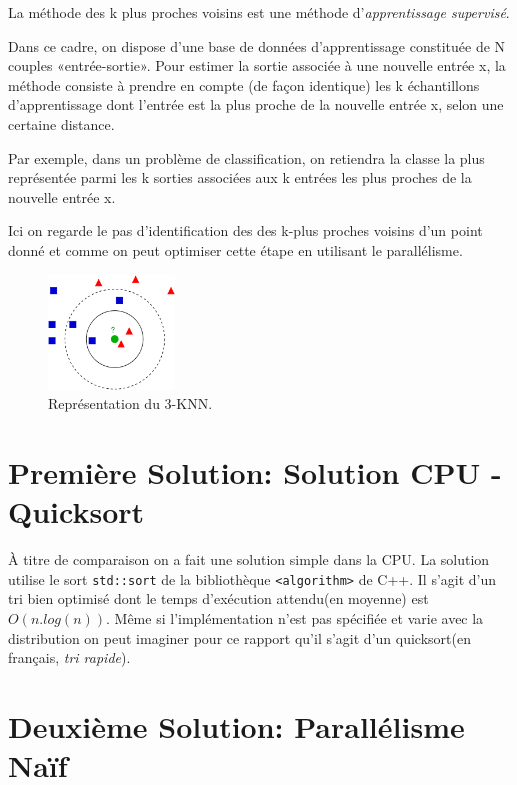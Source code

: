 \documentclass[12pt,oneside]{article}
\begin{document}
La méthode des k plus proches voisins est une méthode d’\textit{apprentissage supervisé}.

Dans ce cadre, on dispose d’une base de données d'apprentissage constituée de N couples «entrée-sortie». Pour estimer la sortie associée à une nouvelle entrée x, la méthode consiste à prendre en compte (de façon identique) les k échantillons d'apprentissage dont l’entrée est la plus proche de la nouvelle entrée x, selon une certaine distance.

Par exemple, dans un problème de classification, on retiendra la classe la plus représentée parmi les k sorties associées aux k entrées les plus proches de la nouvelle entrée x.

Ici on regarde le pas d'identification des des k-plus proches voisins d'un point donné et comme on peut optimiser cette étape en utilisant le parallélisme.

\begin{figure}[h]
\centering
\includegraphics[width=0.3\textwidth]{../figures/KNN.png}
\caption{\label{fig:3KNN} Représentation du 3-KNN.}
\end{figure}




\section{Première Solution: Solution CPU - Quicksort}

À titre de comparaison on a fait une solution simple dans la CPU. La solution utilise le sort \texttt{std::sort} de la bibliothèque \texttt{<algorithm>} de C++. Il s'agit d'un tri bien optimisé dont le temps d’exécution attendu(en moyenne) est $O(n.log(n))$. Même si l’implémentation n'est pas spécifiée et varie avec la distribution on peut imaginer pour ce rapport qu'il s'agit d'un quicksort(en français, \textit{tri rapide}).



\section{Deuxième Solution: Parallélisme Naïf}
\end{document}
